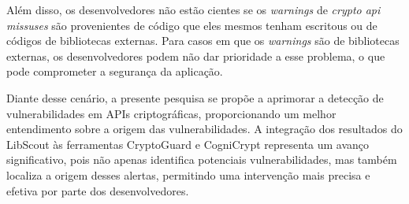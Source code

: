 Além disso, os desenvolvedores não estão cientes se os \textit{warnings} de  \textit{crypto api missuses} são provenientes de código que eles mesmos tenham escritous ou de códigos de bibliotecas externas. Para casos em que os \textit{warnings} são de bibliotecas externas, os desenvolvedores podem não dar prioridade a esse problema, o que pode comprometer a segurança da aplicação.

Diante desse cenário, a presente pesquisa se propõe a aprimorar a detecção de vulnerabilidades em APIs criptográficas, proporcionando um melhor entendimento sobre a origem das vulnerabilidades. A integração dos resultados do LibScout às ferramentas CryptoGuard e CogniCrypt representa um avanço significativo, pois não apenas identifica potenciais vulnerabilidades, mas também localiza a origem desses alertas, permitindo uma intervenção mais precisa e efetiva por parte dos desenvolvedores.
